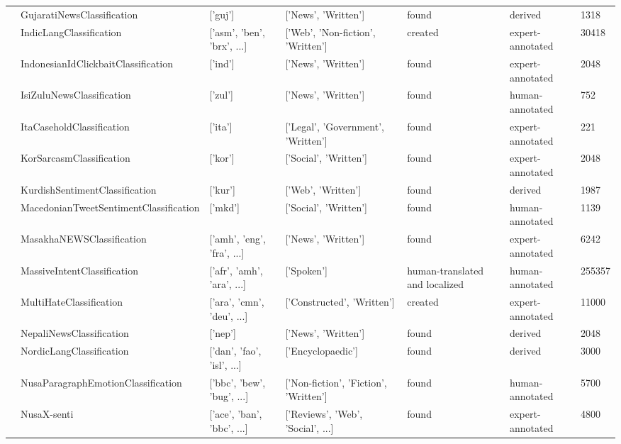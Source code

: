 \begin{table*}[!htb]
{\begin{tabular}{lllllll}
     & GujaratiNewsClassification  & ['guj'] & ['News', 'Written'] & found & derived & 1318 \\
     & IndicLangClassification \cite{madhani-etal-2023-bhasa} & ['asm', 'ben', 'brx', ...] & ['Web', 'Non-fiction', 'Written'] & created & expert-annotated & 30418 \\
     & IndonesianIdClickbaitClassification \cite{WILLIAM2020106231} & ['ind'] & ['News', 'Written'] & found & expert-annotated & 2048 \\
     & IsiZuluNewsClassification \cite{Madodonga_Marivate_Adendorff_2023} & ['zul'] & ['News', 'Written'] & found & human-annotated & 752 \\
     & ItaCaseholdClassification \cite{10.1145/3594536.3595177} & ['ita'] & ['Legal', 'Government', 'Written'] & found & expert-annotated & 221 \\
     & KorSarcasmClassification \cite{kim2019kocasm} & ['kor'] & ['Social', 'Written'] & found & expert-annotated & 2048 \\
     & KurdishSentimentClassification \cite{article} & ['kur'] & ['Web', 'Written'] & found & derived & 1987 \\
     & MacedonianTweetSentimentClassification \cite{jovanoski-etal-2015-sentiment} & ['mkd'] & ['Social', 'Written'] & found & human-annotated & 1139 \\
     & MasakhaNEWSClassification \cite{adelani2023masakhanews} & ['amh', 'eng', 'fra', ...] & ['News', 'Written'] & found & expert-annotated & 6242 \\
     & MassiveIntentClassification \cite{fitzgerald2022massive} & ['afr', 'amh', 'ara', ...] & ['Spoken'] & human-translated and localized & human-annotated & 255357 \\
     & MultiHateClassification \cite{rottger-etal-2021-hatecheck} & ['ara', 'cmn', 'deu', ...] & ['Constructed', 'Written'] & created & expert-annotated & 11000 \\
     & NepaliNewsClassification \cite{arora-2020-inltk} & ['nep'] & ['News', 'Written'] & found & derived & 2048 \\
     & NordicLangClassification \cite{haas-derczynski-2021-discriminating} & ['dan', 'fao', 'isl', ...] & ['Encyclopaedic'] & found & derived & 3000 \\
     & NusaParagraphEmotionClassification \cite{cahyawijaya-etal-2023-nusawrites} & ['bbc', 'bew', 'bug', ...] & ['Non-fiction', 'Fiction', 'Written'] & found & human-annotated & 5700 \\
     & NusaX-senti \cite{winata2022nusax} & ['ace', 'ban', 'bbc', ...] & ['Reviews', 'Web', 'Social', ...] & found & expert-annotated & 4800 \\

\end{tabular}}
\end{table*}

